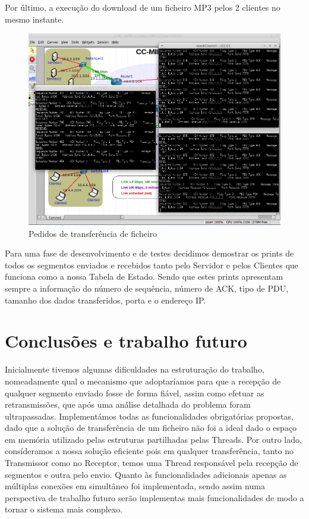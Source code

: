 \documentclass{article}
\begin{document}
Por último, a execução do download de um ficheiro MP3 pelos 2 clientes no mesmo instante.
\begin{figure}[H]
\centering
\includegraphics[scale=0.4]{img/download.png}
\caption{Pedidos de transferência de ficheiro}
\end{figure}
Para uma fase de desenvolvimento e de testes decidimos demostrar os prints de todos os segmentos enviados e recebidos tanto pelo Servidor e
pelos Clientes que funciona como a nossa Tabela de Estado. Sendo que estes prints apresentam sempre a informação do número de sequência,
número de ACK, tipo de PDU, tamanho dos dados transferidos, porta e o endereço IP.
\newpage
\section{Conclusões e trabalho futuro}
Inicialmente tivemos algumas dificuldades na estruturação do trabalho, nomeadamente qual o mecanismo que adoptaríamos para que a recepção de qualquer segmento
enviado fosse de forma fiável, assim como efetuar as retransmissões, que após uma análise detalhada
do problema foram ultrapassadas. Implementámos todas as funcionalidades obrigatórias propostas, dado que a solução de transferência
de um ficheiro não foi a ideal dado o espaço em memória utilizado pelas estruturas partilhadas pelas Threads. Por outro lado, consíderamos
a nossa solução eficiente pois em qualquer transferência, tanto no Transmissor como no Receptor, temos uma Thread responsável 
pela recepção de segmentos e outra pelo envio. Quanto às funcionalidades adicionais apenas as múltiplas conexões em simultâneo foi 
implementada, 
sendo assim numa perspectiva de trabalho futuro serão implementas mais funcionalidades de modo a tornar o sistema mais complexo. 
\end{document}
